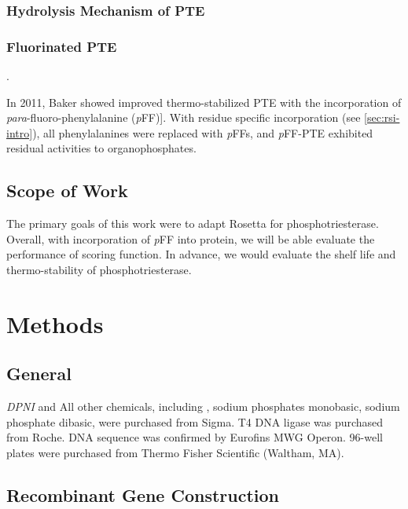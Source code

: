 \begin{refsection}
\subsubsection{Hydrolysis Mechanism of PTE}

\subsubsection{Fluorinated PTE}.

In 2011, Baker  showed improved thermo-stabilized PTE with the
incorporation of \emph{para}-fluoro-phenylalanine
(\emph{p}FF)]\cite{Baker2011b}. With residue specific incorporation (see
\ref{sec:rsi-intro}), all phenylalanines were replaced with \emph{p}FFs, and
\emph{p}FF-PTE exhibited residual activities to organophosphates.

\subsection{Scope of Work}

The primary goals of this work were to adapt Rosetta for phosphotriesterase.
Overall, with incorporation of \emph{p}FF into protein, we will be able
evaluate the performance of scoring function. In advance, we would evaluate the
shelf life and thermo-stability of phosphotriesterase.

\section{Methods}

\subsection{General}

\emph{DPNI} and  All other chemicals, including , sodium phosphates
monobasic, sodium phosphate dibasic, were purchased from Sigma. T4 DNA ligase
was purchased from Roche. DNA sequence was confirmed by Eurofins MWG Operon.
96-well plates were purchased from Thermo Fisher Scientific (Waltham, MA).

\subsection{Recombinant Gene Construction}


\end{refsection}
